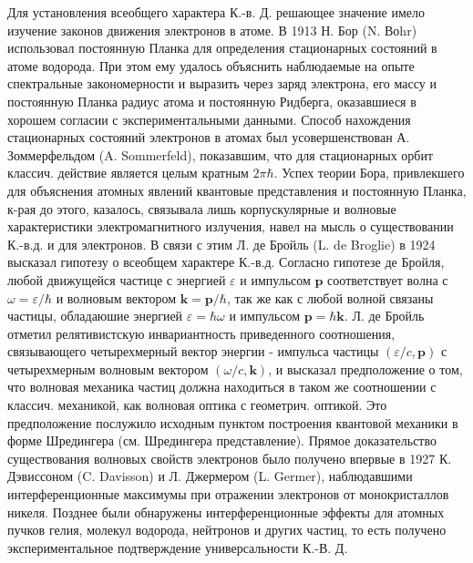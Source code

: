 \documentclass[10pt]{article}
\begin{document}
Для установления всеобщего характера К.-в. Д. решающее значение имело изучение законов движения электронов в атоме. В 1913 Н. Бор (N. Воhr) использовал постоянную Планка для определения стационарных состояний в атоме водорода. При этом ему удалось объяснить наблюдаемые на опыте спектральные закономерности и выразить через заряд электрона, его массу и постоянную Планка радиус атома и постоянную Ридберга, оказавшиеся в хорошем согласии с экспериментальными данными. Способ нахождения стационарных состояний электронов в атомах был усовершенствован А. Зоммерфельдом (A. Sommerfeld), показавшим, что для стационарных орбит классич. действие является целым кратным $2 \pi \hbar$. Успех теории Бора, привлекшего для объяснения атомных явлений квантовые представления и постоянную Планка, к-рая до этого, казалось, связывала лишь корпускулярные и волновые характеристики электромагнитного излучения, навел на мысль о существовании К.-в.д. и для электронов. В связи с этим Л. де Бройль (L. de Broglie) в 1924 высказал гипотезу о всеобщем характере К.-в.д. Согласно гипотезе де Бройля, любой движущейся частице с энергией $\varepsilon$ и импульсом $\boldsymbol{p}$ соответствует волна с $\omega=\varepsilon / \hbar$ и волновым вектором $\boldsymbol{k}=\boldsymbol{p} / \hbar$, так же как с любой волной связаны частицы, обладаюшие энергией $\varepsilon=\hbar \omega$ и импульсом $\boldsymbol{p}=\hbar \boldsymbol{k}$. Л. де Бройль отметил релятивистскую инвариантность приведенного соотношения, связывающего четырехмерный вектор энергии - импульса частицы $(\varepsilon / c, \boldsymbol{p})$ с четырехмерным волновым вектором $(\omega / c, \boldsymbol{k})$, и высказал предположение о том, что волновая механика частиц должна находиться в таком же соотношении с классич. механикой, как волновая оптика с геометрич. оптикой. Это предположение послужило исходным пунктом построения квантовой механики в форме Шредингера (см. Шредингера представление). Прямое доказательство существования волновых свойств электронов было получено впервые в 1927 К. Дэвиссоном (C. Davisson) и Л. Джермером (L. Germer), наблюдавшими интерференционные максимумы при отражении электронов от монокристаллов никеля. Позднее были обнаружены интерференционные эффекты для атомных пучков гелия, молекул водорода, нейтронов и других частиц, то есть получено экспериментальное подтверждение универсальности К.-В. Д.
\end{document}
